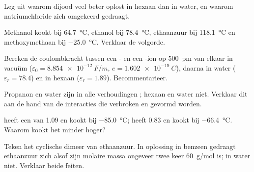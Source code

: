 \begin{exercise}[$\star$]\label{exo:b1:intermolecular-forces-solvents:4}
Leg uit waarom dijood veel beter oplost in hexaan dan in water, en
waarom natriumchloride zich omgekeerd gedraagt.
\end{exercise}

\begin{exercise}[$\star\star$]\label{exo:b1:intermolecular-forces-solvents:5}
Methanol kookt bij \qty{64.7}{\celsius}, ethanol bij \qty{78.4}{\celsius},
ethaanzuur bij \qty{118.1}{\celsius} en methoxymethaan bij
\qty{-25.0}{\celsius}. Verklaar de volgorde.
\end{exercise}


\begin{exercise}[$\star\star$]\label{exo:b1:intermolecular-forces-solvents:6}
Bereken de coulombkracht tussen een - en een -ion op
\qty{500}{pm} van elkaar in vacuüm ($\varepsilon_0 = \qty{8.854e-12}{F/m}$,
$e = \qty{1.602e-19}{C}$), daarna in water ($\varepsilon_r = 78.4$) en in
hexaan ($\varepsilon_r = 1.89$). Becommentarieer.
\end{exercise}

\begin{exercise}[$\star\star$]\label{exo:b1:intermolecular-forces-solvents:7}
Propanon en water zijn in alle verhoudingen ; hexaan en water
niet. Verklaar dit aan de hand van de interacties die verbroken en
gevormd worden.
\end{exercise}

\begin{exercise}[$\star\star$]\label{exo:b1:intermolecular-forces-solvents:8}
 heeft een  van \qty{1.09}{\debye} en kookt bij
\qty{-85.0}{\celsius};  heeft \qty{0.83}{\debye} en kookt bij
\qty{-66.4}{\celsius}. Waarom kookt het minder  hoger?
\end{exercise}


\begin{exercise}[$\star\star$]\label{exo:b1:intermolecular-forces-solvents:9}
Teken het cyclische dimeer van ethaanzuur. In oplossing in benzeen
gedraagt ethaanzuur zich alsof zijn molaire massa ongeveer twee keer
\qty{60}{g/mol} is; in water niet. Verklaar beide feiten.
\end{exercise}


